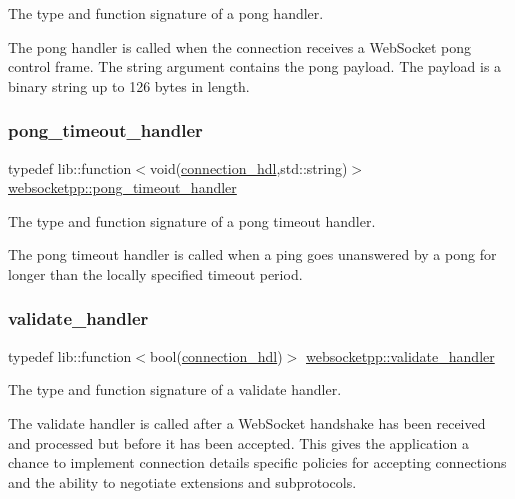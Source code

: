 The type and function signature of a pong handler. 

The pong handler is called when the connection receives a Web\+Socket pong control frame. The string argument contains the pong payload. The payload is a binary string up to 126 bytes in length. \mbox{\label{namespacewebsocketpp_a2c5925a111b9e553efebea35d5ea155f}} 
\subsubsection{\texorpdfstring{pong\+\_\+timeout\+\_\+handler}{pong\_timeout\_handler}}
{\footnotesize\ttfamily typedef lib\+::function$<$void(\mbox{\hyperlink{namespacewebsocketpp_a6b3d26a10ee7229b84b776786332631d}{connection\+\_\+hdl}},std\+::string)$>$ \mbox{\hyperlink{namespacewebsocketpp_a2c5925a111b9e553efebea35d5ea155f}{websocketpp\+::pong\+\_\+timeout\+\_\+handler}}}



The type and function signature of a pong timeout handler. 

The pong timeout handler is called when a ping goes unanswered by a pong for longer than the locally specified timeout period. \mbox{\label{namespacewebsocketpp_ae28f3fed86a59b1998746694f3d4edbd}} 
\subsubsection{\texorpdfstring{validate\+\_\+handler}{validate\_handler}}
{\footnotesize\ttfamily typedef lib\+::function$<$bool(\mbox{\hyperlink{namespacewebsocketpp_a6b3d26a10ee7229b84b776786332631d}{connection\+\_\+hdl}})$>$ \mbox{\hyperlink{namespacewebsocketpp_ae28f3fed86a59b1998746694f3d4edbd}{websocketpp\+::validate\+\_\+handler}}}



The type and function signature of a validate handler. 

The validate handler is called after a Web\+Socket handshake has been received and processed but before it has been accepted. This gives the application a chance to implement connection details specific policies for accepting connections and the ability to negotiate extensions and subprotocols.

